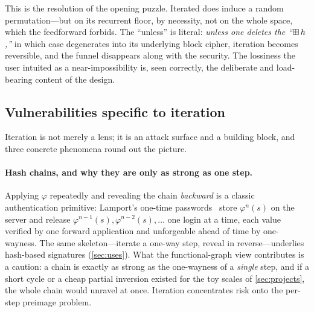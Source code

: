 This is the resolution of the opening puzzle. Iterated \SHA{} does induce
a random permutation---but on its recurrent floor, by necessity, not on
the whole space, which the feedforward forbids. The ``unless'' is
literal: \emph{unless one deletes the ``$\boxplus\,h$,''} in which case
\SHA{} degenerates into its underlying block cipher, iteration becomes
reversible, and the funnel disappears along with the security. The
lossiness the user intuited as a near-impossibility is, seen correctly,
the deliberate and load-bearing content of the design.

\subsection{Vulnerabilities specific to iteration}\label{sec:itervuln}

Iteration is not merely a lens; it is an attack surface and a building
block, and three concrete phenomena round out the picture.

\paragraph{Hash chains, and why they are only as strong as one step.}
Applying $\varphi$ repeatedly and revealing the chain \emph{backward} is
a classic authentication primitive: Lamport's one-time
passwords~\citep{Lamport1981} store $\varphi^{n}(s)$ on the server and
release $\varphi^{n-1}(s), \varphi^{n-2}(s), \dots$ one login at a time,
each value verified by one forward application and unforgeable ahead of
time by one-wayness. The same skeleton---iterate a one-way step, reveal
in reverse---underlies hash-based signatures (\cref{sec:uses}). What the
functional-graph view contributes is a caution: a chain is exactly as
strong as the one-wayness of a \emph{single} step, and if a short cycle
or a cheap partial inversion existed for the toy scales of
\cref{sec:projects}, the whole chain would unravel at once. Iteration
concentrates risk onto the per-step preimage problem.

